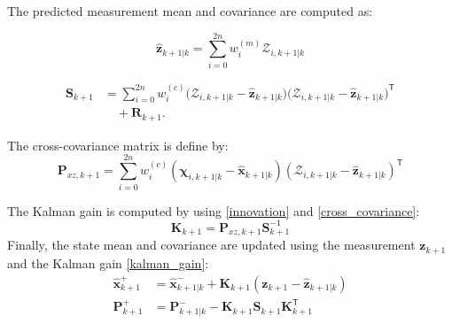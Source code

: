 \documentclass[conference]{IEEEtran}
\begin{document}
\noindent The predicted measurement mean and covariance are computed as:

\begin{equation}
\hat{\mathbf{z}}_{k+1|k} =
\sum_{i=0}^{2n} w_i^{(m)} \mathbf{\mathcal{Z}}_{i,k+1|k}
\end{equation}

\begin{align}
\mathbf{S}_{k+1}
&=
\sum_{i=0}^{2n} w_i^{(c)}
\bigl(
\mathbf{\mathcal{Z}}_{i,k+1|k} - \hat{\mathbf{z}}_{k+1|k}
\bigr)
\bigl(
\mathbf{\mathcal{Z}}_{i,k+1|k} - \hat{\mathbf{z}}_{k+1|k}
\bigr)^{\mathsf{T}}
\nonumber\\
&\quad + \mathbf{R}_{k+1}.
\label{innovation}
\end{align}


\noindent The cross-covariance matrix is define by:
\begin{equation}
\mathbf{P}_{xz,k+1} =
\sum_{i=0}^{2n} w_i^{(c)}
(\boldsymbol{\chi}_{i,k+1|k} - \hat{\mathbf{x}}_{k+1|k})
(\mathbf{\mathcal{Z}}_{i,k+1|k} - \hat{\mathbf{z}}_{k+1|k})^\mathsf{T}
\label{cross_covariance}
\end{equation}

\noindent The Kalman gain is computed by using \eqref{innovation} and \eqref{cross_covariance}:
\begin{equation}
\mathbf{K}_{k+1} = \mathbf{P}_{xz,k+1} \mathbf{S}_{k+1}^{-1}
\label{kalman_gain}
\end{equation}
\noindent Finally, the state mean and covariance are updated using the measurement $\mathbf{z}_{k+1}$ and the Kalman gain \eqref{kalman_gain}:
\begin{align}
\hat{\mathbf{x}}_{k+1}^{+} &=
\hat{\mathbf{x}}_{k+1|k}^{-} +
\mathbf{K}_{k+1}(\mathbf{z}_{k+1} - \hat{\mathbf{z}}_{k+1|k}) \\
\mathbf{P}_{k+1}^{+} &=
\mathbf{P}_{k+1|k}^{-} -
\mathbf{K}_{k+1} \mathbf{S}_{k+1} \mathbf{K}_{k+1}^\mathsf{T}
\end{align}
\end{document}

